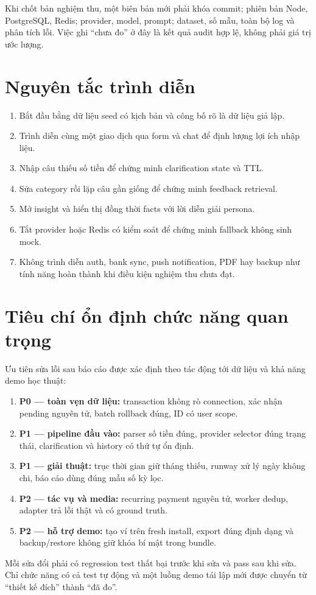 Khi chốt bản nghiệm thu, một biên bản mới phải khóa commit; phiên bản Node, PostgreSQL, Redis; provider, model, prompt; dataset, số mẫu, toàn bộ log và phân tích lỗi. Việc ghi ``chưa đo'' ở đây là kết quả audit hợp lệ, không phải giá trị ước lượng.

\chapter{Nguyên tắc trình diễn}

\begin{enumerate}
  \item Bắt đầu bằng dữ liệu seed có kịch bản và công bố rõ là dữ liệu giả lập.
  \item Trình diễn cùng một giao dịch qua form và chat để định lượng lợi ích nhập liệu.
  \item Nhập câu thiếu số tiền để chứng minh clarification state và TTL.
  \item Sửa category rồi lặp câu gần giống để chứng minh feedback retrieval.
  \item Mở insight và hiển thị đồng thời facts với lời diễn giải persona.
  \item Tắt provider hoặc Redis có kiểm soát để chứng minh fallback không sinh mock.
  \item Không trình diễn auth, bank sync, push notification, PDF hay backup như tính năng hoàn thành khi điều kiện nghiệm thu chưa đạt.
\end{enumerate}

\chapter{Tiêu chí ổn định chức năng quan trọng}

Ưu tiên sửa lỗi sau báo cáo được xác định theo tác động tới dữ liệu và khả năng demo học thuật:

\begin{enumerate}
  \item \textbf{P0 --- toàn vẹn dữ liệu:} transaction không rò connection, xác nhận pending nguyên tử, batch rollback đúng, ID có user scope.
  \item \textbf{P1 --- pipeline đầu vào:} parser số tiền đúng, provider selector đúng trạng thái, clarification và history có thứ tự ổn định.
  \item \textbf{P1 --- giải thuật:} trục thời gian giữ tháng thiếu, runway xử lý ngày không chi, báo cáo dùng đúng mẫu số kỳ lọc.
  \item \textbf{P2 --- tác vụ và media:} recurring payment nguyên tử, worker dedup, adapter trả lỗi thật và có ground truth.
  \item \textbf{P2 --- hỗ trợ demo:} tạo ví trên fresh install, export đúng định dạng và backup/restore không giữ khóa bí mật trong bundle.
\end{enumerate}

Mỗi sửa đổi phải có regression test thất bại trước khi sửa và pass sau khi sửa. Chỉ chức năng có cả test tự động và một luồng demo tái lập mới được chuyển từ ``thiết kế đích'' thành ``đã đo''.
